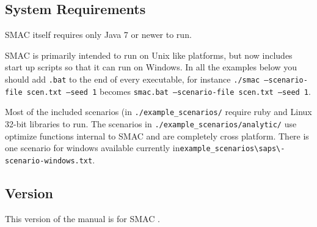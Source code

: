 \documentclass[manual.tex]{subfiles}
\begin{document}
\subsection{System Requirements}

SMAC itself requires only Java 7 or newer to run. 

SMAC is primarily intended to run on Unix like platforms, but now includes start up scripts so that it can run on Windows. In all the examples below you should add \texttt{.bat} to the end of every executable, for instance \texttt{./smac --scenario-file scen.txt --seed 1} becomes \texttt{smac.bat --scenario-file scen.txt --seed 1}.

Most of the included scenarios (in \texttt{./example\_scenarios/} require ruby and Linux 32-bit libraries to run. The scenarios in \texttt{./example\_scenarios/analytic/} use optimize functions internal to SMAC and are completely cross platform. There is one scenario for windows available currently in\texttt{example\_scenarios\textbackslash saps\textbackslash\saps-scenario-windows.txt}.


\subsection{Version}
This version of the manual is for SMAC $\!\!$.
\\




\end{document}
